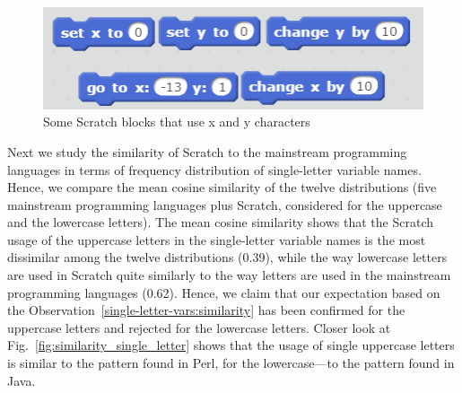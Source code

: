 \documentclass[conference]{IEEEtran}
\newcommand{\todo}[1]{ \textbf{#1} }
\begin{document}
\begin{figure}[h]
	\begin{center}
		\includegraphics[width=\columnwidth]{fig/builtinblocks_xy}
		\caption{Some Scratch blocks that use x and y characters}
		\label{fig:xy_Scratchblocks}
	\end{center}
\end{figure} 


Next we study the similarity of Scratch to the mainstream programming languages in terms of frequency distribution of single-letter variable names.
Hence, we compare the mean cosine similarity of the twelve distributions (five mainstream programming languages plus Scratch, considered for the
uppercase and the lowercase letters).
The mean cosine similarity shows that the Scratch usage of the uppercase letters in the single-letter variable names is the most dissimilar among the
twelve distributions (0.39), while the way lowercase letters are used in Scratch quite similarly to the way letters are used in the mainstream programming languages (0.62).
Hence, we claim that our expectation based on the Observation~\ref{single-letter-vars:similarity} has been confirmed for the uppercase letters and  rejected for the lowercase letters. 
Closer look at Fig.~\ref{fig:similarity_single_letter} shows that the usage of single uppercase letters is similar to the pattern found in Perl, for the lowercase---to the pattern found in Java.
\end{document}
